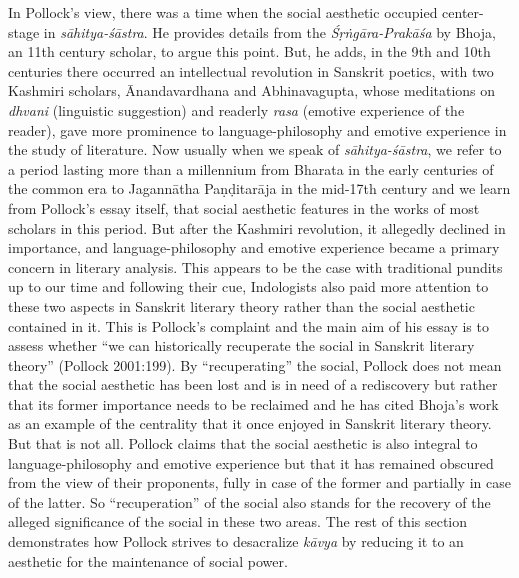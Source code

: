 In Pollock's view, there was a time when the social aesthetic occupied center-stage in \textsl{sāhitya-śāstra}. He provides details from the \textsl{Śṛṅgāra-Prakāśa} by Bhoja, an 11th century scholar, to argue this point. But, he adds, in the 9th and 10th centuries there occurred an intellectual revolution in Sanskrit poetics, with two Kashmiri scholars, Ānandavardhana and Abhinavagupta, whose meditations on \textsl{dhvani} (linguistic suggestion) and readerly \textsl{rasa} (emotive experience of the reader), gave more prominence to language-philosophy and emotive experience in the study of literature. Now usually when we speak of \textsl{sāhitya-śāstra}, we refer to a period lasting more than a millennium from Bharata in the early centuries of the common era to Jagannātha Paṇḍitarāja in the mid-17th century and we learn from Pollock's essay itself, that social aesthetic features in the works of most scholars in this period. But after the Kashmiri revolution, it allegedly declined in importance, and language-philosophy and emotive experience became a primary concern in literary analysis. This appears to be the case with traditional pundits up to our time and following their cue, Indologists also paid more attention to these two aspects in Sanskrit literary theory rather than the social aesthetic contained in it. This is Pollock's complaint and the main aim of his essay is to assess whether ``we can historically recuperate the social in Sanskrit literary theory'' (Pollock 2001:199). By ``recuperating'' the social, Pollock does not mean that the social aesthetic has been lost and is in need of a rediscovery but rather that its former importance needs to be reclaimed and he has cited Bhoja's work as an example of the centrality that it once enjoyed in Sanskrit literary theory. But that is not all. Pollock claims that the social aesthetic is also integral to language-philosophy and emotive experience but that it has remained obscured from the view of their proponents, fully in case of the former and partially in case of the latter. So ``recuperation'' of the social also stands for the recovery of the alleged significance of the social in these two areas. The rest of this section demonstrates how Pollock strives to desacralize \textsl{kāvya} by reducing it to an aesthetic for the maintenance of social power.

